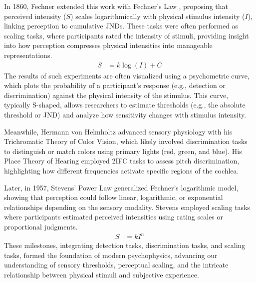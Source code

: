 In 1860, Fechner extended this work with Fechner’s Law \cite{johnson2002}, proposing that perceived intensity ($S$) scales logarithmically with physical stimulus intensity ($I$), linking perception to cumulative JNDs.  These tasks were often performed as scaling tasks, where participants rated the intensity of stimuli, providing insight into how perception compresses physical intensities into manageable representations.
\begin{align}
S& = k \log(I) + C
\end{align}
The results of such experiments are often visualized using a psychometric curve, which plots the probability of a participant’s response (e.g., detection or discrimination) against the physical intensity of the stimulus. This curve, typically S-shaped, allows researchers to estimate thresholds (e.g., the absolute threshold or JND) and analyze how sensitivity changes with stimulus intensity.

Meanwhile, Hermann von Helmholtz advanced sensory physiology with his Trichromatic Theory of Color Vision, which likely involved discrimination tasks to distinguish or match colors using primary lights (red, green, and blue). His Place Theory of Hearing employed 2IFC tasks to assess pitch discrimination, highlighting how different frequencies activate specific regions of the cochlea.  \cite{yost_human_1993}

Later, in 1957, Stevens’ Power Law generalized Fechner’s logarithmic model, showing that perception could follow linear, logarithmic, or exponential relationships depending on the sensory modality. Stevens employed scaling tasks where participants estimated perceived intensities using rating scales or proportional judgments.
\begin{align}
S& = k I^n
\end{align}
These milestones, integrating detection tasks, discrimination tasks, and scaling tasks, formed the foundation of modern psychophysics, advancing our understanding of sensory thresholds, perceptual scaling, and the intricate relationship between physical stimuli and subjective experience.

